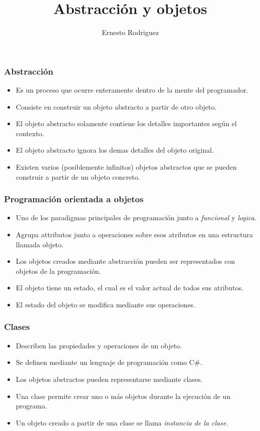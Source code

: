 \documentclass{beamer}
\title[Git]{Abstracci\'on y objetos}
\author{Ernesto Rodriguez}
\institute{
    Universidad del Itsmo \\
    \medskip \textit{erodriguez@unis.edu.gt}
}
\date[\today]{}
\begin{document}
\begin{frame}
\titlepage
\end{frame}

\begin{frame}
\frametitle{Abstracci\'on}
\begin{itemize}
    \item Es un proceso que ocurre enteramente dentro de la mente del programador.
    \item Consiste en construir un objeto abstracto a partir de otro objeto.
    \item El objeto abstracto solamente contiene los detalles importantes seg\'un el contexto.
    \item El objeto abstracto ignora los demas detalles del objeto original.
    \item Existen varios (posiblemente infinitos) objetos abstractos que se pueden construir a partir de un objeto concreto.
\end{itemize}
\end{frame}

\begin{frame}
\frametitle{Programaci\'on orientada a objetos}
\begin{itemize}
    \item Uno de los paradigmas principales de programaci\'on junto a \emph{funcional} y \emph{logica}.
    \item Agrupa attributos junto a operaciones sobre esos atributos en una estructura llamada objeto.
    \item Los objetos creados mediante abstracci\'on pueden ser representados con objetos de la programaci\'on.
    \item El objeto tiene un estado, el cual es el valor actual de todos sus atributos.
    \item El estado del objeto se modifica mediante sus operaciones.
\end{itemize}
\end{frame}

\begin{frame}
\frametitle{Clases}
\begin{itemize}
    \item Describen las propiedades y operaciones de un objeto.
    \item Se definen mediante un lenguaje de programaci\'on como C\#.
    \item Los objetos abstractos pueden representarse mediante clases.
    \item Una clase permite crear uno o m\'as objetos durante la ejecuci\'on de un programa.
    \item Un objeto creado a partir de una clase se llama \emph{instancia de la clase}.
\end{itemize}
\end{frame}
\end{document}
